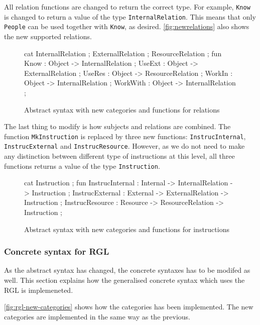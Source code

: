 All relation functions are changed to return the correct type. For example, \texttt{Know} is changed to return a value of the type \texttt{InternalRelation}. This means that only \texttt{People} can be used together with \texttt{Know}, as desired. \autoref{fig:newrelations} also shows the new supported relations.

\begin{figure}[H]
\begin{code}
cat
  InternalRelation ;
  ExternalRelation ;
  ResourceRelation ;
fun
  Know     : Object -> InternalRelation ;
  UseExt   : Object -> ExternalRelation ;
  UseRes   : Object -> ResourceRelation ;
  WorkIn   : Object -> InternalRelation ;
  WorkWith : Object -> InternalRelation ;
\end{code}
\caption{Abstract syntax with new categories and functions for relations \label{fig:newrelations}}
\end{figure}

The last thing to modify is how subjects and relations are combined. The function \texttt{MkInstruction} is replaced by three new functions: \texttt{InstrucInternal}, \texttt{InstrucExternal} and \texttt{InstrucResource}. However, as we do not need to make any distinction between different type of instructions at this level, all three functions returns a value of the type \texttt{Instruction}.

\begin{figure}[H]
\begin{code}
cat
  Instruction ;
fun
  InstrucInternal : Internal -> InternalRelation -> Instruction ;
  InstrucExternal : External -> ExternalRelation -> Instruction ;
  InstrucResource : Resource -> ResourceRelation -> Instruction ;
\end{code}
\caption{Abstract syntax with new categories and functions for instructions\label{fig:newinstructions}}
\end{figure}

\subsubsection{Concrete syntax for RGL}
As the abstract syntax has changed, the concrete syntaxes has to be modifed as well. This section explains how the generalised concrete syntax which uses the RGL is implemeneted. 

\autoref{fig:rgl-new-categories} shows how the categories has been implemented. The new categories are implemented in the same way as the previous.

